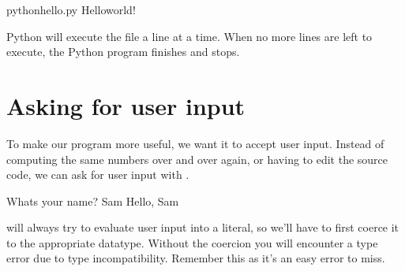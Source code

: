 \documentclass[letterpaper,10pt,english]{jupyterBook}
\begin{document}
\begin{sphinxVerbatim}[commandchars=\\\{\}]
\PYGZdl{}pythonhello.py
Helloworld!
\end{sphinxVerbatim}

\sphinxAtStartPar
{}

\sphinxAtStartPar
Python will execute the file a line at a time.
When no more lines are left to execute, the Python program finishes and stops.


\section{Asking for user input}
\label{\detokenize{first-program:asking-for-user-input}}
\sphinxAtStartPar
To make our program more useful, we want it to accept user input.
Instead of computing the same numbers over and over again, or having to edit the source code, we can ask for user input with .

\begin{sphinxVerbatim}[commandchars=\\\{\}]
  

  
\end{sphinxVerbatim}

\begin{sphinxVerbatim}[commandchars=\\\{\}]
What\PYGZsq{}s your name?
Sam
Hello, Sam
\end{sphinxVerbatim}

\sphinxAtStartPar
{} will always try to evaluate user input into a  literal, so  we’ll have to first coerce it to the appropriate datatype. Without the coercion you will encounter a type error due to type incompatibility. Remember this as it’s an easy error to miss.

\begin{sphinxVerbatim}[commandchars=\\\{\}]
  
  
\end{sphinxVerbatim}
\end{document}
